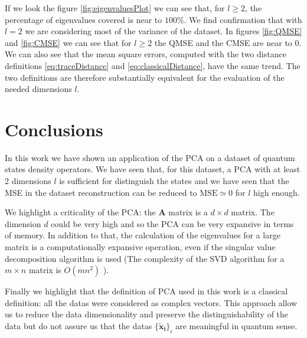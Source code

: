\documentclass[%
    twoside, 
    a4paper
    ]{article}
\begin{document}
    If we look the figure \ref{fig:eigenvaluesPlot} we can see that, for $l \geq 2$, the percentage of
    eigenvalues covered is near to $100\%$. We find confirmation that with $l=2$ we are considering most of 
    the variance of the dataset.
    In figures \ref{fig:QMSE} and \ref{fig:CMSE} we can see that for $l \geq 2$ the QMSE and the CMSE are near 
    to $0$.
    We can also see that the mean square errors, computed with the two distance definitions \ref{eq:traceDistance}
    and \ref{eq:classicalDistance}, have the same trend. The two definitions are therefore substantially equivalent
    for the evaluation of the needed dimensions $l$.
\section{Conclusions}
    In this work we have shown an application of the PCA on a dataset of quantum states density operators.
    We have seen that, for this dataset, a PCA with at least 2 dimensions $l$ is sufficient for distinguish
    the states and we have seen that the MSE in the dataset reconstruction can be reduced to 
    $\mathrm{MSE} \simeq 0$ for $l$ high enough.

    We highlight a criticality of the PCA: the $\bm{A}$ matrix is a $d \times d$ matrix. The dimension $d$
    could be very high and so the PCA can be very expansive in terms of memory.
    In addition to that, the calculation of the eigenvalues for a large matrix is a computationally 
    expansive operation, even if the singular value decomposition algorithm is used (The complexity
    of the SVD algorithm for a $m \times n$ matrix is $O(mn^2)$ \cite{DBLP:journals/corr/abs-1710-02812}).

    Finally we highlight that the definition of PCA used in this work is a classical definition: all the
    datas were considered as complex vectors. 
    This approach allow us to reduce the data dimensionality and preserve the distinguishability of 
    the data but do not assure us that the datas $\{\bm{\tilde{x}_i}\}_i$ are meaningful in quantum sense.

\newpage


\end{document}
